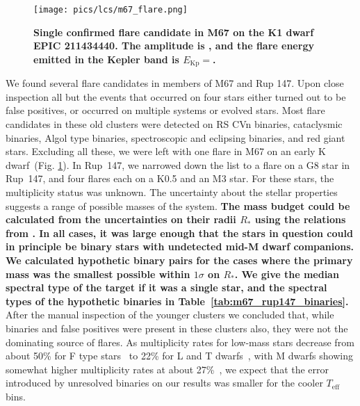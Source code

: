 \documentclass{aa}
\begin{document}
\begin{figure}[ht!]
    \centering
    \texttt{[image: pics/lcs/m67\_flare.png]}
    \caption{\textbf{Single confirmed flare candidate in M67 on the K1 dwarf EPIC 211434440. The amplitude is \unskip, and the flare energy emitted in the Kepler band is $E_\mathrm{Kp}=$.}}          
    \label{fig:m67}
\end{figure}
We found several flare candidates in members of M67 and Rup 147. Upon close inspection all but the events that occurred on four stars either turned out to be false positives, or occurred on multiple systems or evolved stars. Most flare candidates in these old clusters were detected on RS CVn binaries, cataclysmic binaries, Algol type binaries, spectroscopic and eclipsing binaries, and red giant stars. Excluding all these, we were left with one flare in M67 on an early K dwarf~(Fig. \ref{fig:m67}). In Rup~147, we narrowed down the list to a flare on a G8 star in Rup~147, and four flares each on a K0.5 and an M3 star. For these stars, the multiplicity status was unknown. The uncertainty about the stellar properties suggests a range of possible masses of the system. \textbf{The mass budget could be calculated from the uncertainties on their radii $R_*$ using the relations from \citet{eker2018}. In all cases, it was large enough that the stars in question could in principle be binary stars with undetected mid-M dwarf companions. We calculated hypothetic binary pairs for the cases where the primary mass was the smallest possible within $1\sigma$ on $R_*$. We give the median spectral type of the target if it was a single star, and the spectral types of the hypothetic binaries in Table~\ref{tab:m67_rup147_binaries}.}
\\
After the manual inspection of the younger clusters we concluded that, while binaries and false positives were present in these clusters also, they were not the dominating source of flares. As multiplicity rates for low-mass stars decrease from about 50\% for F type stars~\citep{raghavan2010} to 22\% for L and T dwarfs~\citep{duchene2013}, with M dwarfs showing somewhat higher multiplicity rates at about 27\%~\citep{winters2019}, we expect that the error introduced by unresolved binaries on our results was smaller for the cooler $T_\mathrm{eff}$ bins.
\end{document}
